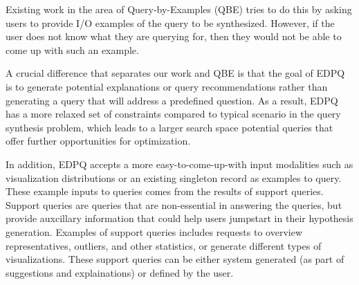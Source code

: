 \documentclass{sig-alternate-05-2015}
\begin{document}
\par Existing work in the area of Query-by-Examples (QBE) tries to do this by asking users to provide I/O examples of the query to be synthesized. However, if the user does not know what they are querying for, then they would not be able to come up with such an example.
\par A crucial difference that separates our work and QBE is that the goal of EDPQ is to generate potential explanations or query recommendations rather than generating a query that will address a predefined question. As a result, EDPQ has a more relaxed set of constraints compared to typical scenario in the query synthesis problem, which leads to a larger search space potential queries that offer further opportunities for optimization.
\par In addition, EDPQ accepts a more easy-to-come-up-with input modalities such as visualization distributions or an existing singleton record as examples to query. These example inputs to queries comes from the results of support queries. Support queries are queries that are non-essential in answering the queries, but provide auxcillary information that could help users jumpstart in their hypothesis generation. Examples of support queries includes requests to overview representatives, outliers, and other statistics, or generate different types of visualizations. These support queries can be either system generated (as part of suggestions and explainations) or defined by the user. 



 

  
\end{document}
